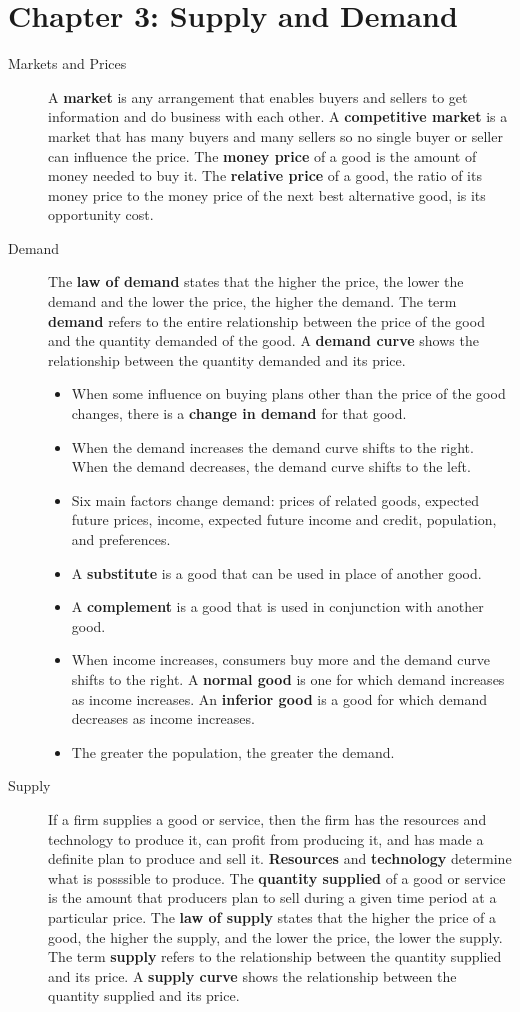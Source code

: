 \documentclass{article}
\begin{document}
\section*{Chapter 3: Supply and Demand}
\begin{description}
    \item [Markets and Prices] A \textbf{market} is any arrangement that enables buyers and sellers to get information and do business with each other. A \textbf{competitive market} is a market that has many buyers and many sellers so no single buyer or seller can influence the price. The \textbf{money price} of a good is the amount of money needed to buy it. The \textbf{relative price} of a good, the ratio of its money price to the money price of the next best alternative good, is its opportunity cost.
    \item [Demand] The \textbf{law of demand} states that the higher the price, the lower the demand and the lower the price, the higher the demand. The term \textbf{demand} refers to the entire relationship between the price of the good and the quantity demanded of the good. A \textbf{demand curve} shows the relationship between the quantity demanded and its price.
    \begin{itemize}
        \item When some influence on buying plans other than the price of the good changes, there is a \textbf{change in demand} for that good.
        \item When the demand increases the demand curve shifts to the right. When the demand decreases, the demand curve shifts to the left.
        \item Six main factors change demand: prices of related goods, expected future prices, income, expected future income and credit, population, and preferences.
        \item A \textbf{substitute} is a good that can be used in place of another good.
        \item A \textbf{complement} is a good that is used in conjunction with another good.
        \item When income increases, consumers buy more and the demand curve shifts to the right. A \textbf{normal good} is one for which demand increases as income increases. An \textbf{inferior good} is a good for which demand decreases as income increases.
        \item The greater the population, the greater the demand.
    \end{itemize}
    \item [Supply] If a firm supplies a good or service, then the firm has the resources and technology to produce it, can profit from producing it, and has made a definite plan to produce and sell it. \textbf{Resources} and \textbf{technology} determine what is posssible to produce. The \textbf{quantity supplied} of a good or service is the amount that producers plan to sell during a given time period at a particular price. The \textbf{law of supply} states that the higher the price of a good, the higher the supply, and the lower the price, the lower the supply. The term \textbf{supply} refers to the relationship between the quantity supplied and its price. A \textbf{supply curve} shows the relationship between the quantity supplied and its price.

\end{description}
\end{document}
